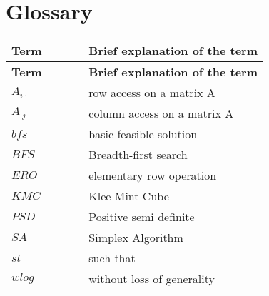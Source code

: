 \documentclass[main]{subfiles}
\begin{document}
\section{Glossary}
\renewcommand{\arraystretch}{1.5}


\begin{longtable}{p{0.3\linewidth} p{0.7\linewidth}}
\hline \textbf{Term} & \textbf{Brief explanation of the term}\\ \hline
\endfirsthead

\hline \textbf{Term} & \textbf{Brief explanation of the term}\\ \hline\hline
\endhead
$A_{i\cdot}$ & row access on a matrix A\\
$A_{\cdot j}$ & column access on a matrix A\\
$bfs$ & basic feasible solution\\
$BFS$ & Breadth-first search\\
$ERO$ & elementary row operation\\
$KMC$ & Klee Mint Cube\\
$PSD$ & Positive semi definite\\
$SA$ & Simplex Algorithm\\
$st$ & such that\\
$wlog$ & without loss of generality\\

\end{longtable}
\end{document}
